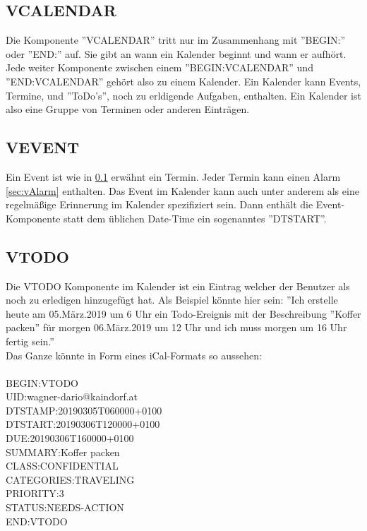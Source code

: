 \subsection{VCALENDAR}
\label{sec:vCalendar} 
Die Komponente ''VCALENDAR'' tritt nur im Zusammenhang mit ''BEGIN:'' oder ''END:'' auf. Sie gibt an wann ein Kalender beginnt und wann er aufhört. Jede weiter Komponente zwischen einem ''BEGIN:VCALENDAR'' und ''END:VCALENDAR'' gehört also zu einem Kalender. Ein Kalender kann Events, Termine, und ''ToDo's'', noch zu erldigende Aufgaben, enthalten. Ein Kalender ist also eine Gruppe von Terminen oder anderen Einträgen. 
\subsection{VEVENT}
\label{sec:vEvent} 
Ein Event ist wie in \ref{sec:vCalendar} erwähnt ein Termin. Jeder Termin kann einen Alarm \ref{sec:vAlarm} enthalten. Das Event im Kalender kann auch unter anderem als eine regelmäßige Erinnerung im Kalender spezifiziert sein. Dann enthält die Event-Komponente statt dem üblichen Date-Time ein sogenanntes ''DTSTART''.
\subsection{VTODO}
\label{sec:vTodo} 
Die VTODO Komponente im Kalender ist ein Eintrag welcher der Benutzer als noch zu erledigen hinzugefügt hat. Als Beispiel könnte hier sein: ''Ich erstelle heute am 05.März.2019 um 6 Uhr ein Todo-Ereignis mit der Beschreibung ''Koffer packen'' für morgen 06.März.2019 um 12 Uhr und ich muss morgen um 16 Uhr fertig sein.'' \\
Das Ganze könnte in Form eines iCal-Formats so aussehen: \\ \\
  BEGIN:VTODO \\
  UID:wagner-dario@kaindorf.at\\
  DTSTAMP:20190305T060000+0100\\
  DTSTART:20190306T120000+0100\\
  DUE:20190306T160000+0100\\
  SUMMARY:Koffer packen\\
  CLASS:CONFIDENTIAL\\
  CATEGORIES:TRAVELING\\
  PRIORITY:3\\
  STATUS:NEEDS-ACTION\\
  END:VTODO\\
  

